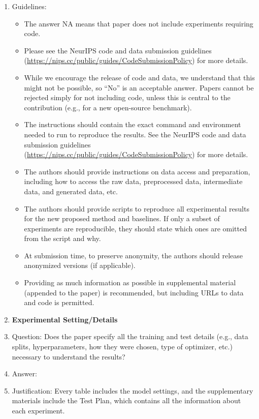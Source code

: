\documentclass{article}
\begin{document}
\begin{enumerate}
    \item[] Guidelines:  
    \begin{itemize}
        \item The answer NA means that paper does not include experiments requiring code.
        \item Please see the NeurIPS code and data submission guidelines (\url{https://nips.cc/public/guides/CodeSubmissionPolicy}) for more details.
        \item While we encourage the release of code and data, we understand that this might not be possible, so “No” is an acceptable answer. Papers cannot be rejected simply for not including code, unless this is central to the contribution (e.g., for a new open-source benchmark).
        \item The instructions should contain the exact command and environment needed to run to reproduce the results. See the NeurIPS code and data submission guidelines (\url{https://nips.cc/public/guides/CodeSubmissionPolicy}) for more details.
        \item The authors should provide instructions on data access and preparation, including how to access the raw data, preprocessed data, intermediate data, and generated data, etc.
        \item The authors should provide scripts to reproduce all experimental results for the new proposed method and baselines. If only a subset of experiments are reproducible, they should state which ones are omitted from the script and why.
        \item At submission time, to preserve anonymity, the authors should release anonymized versions (if applicable).
        \item Providing as much information as possible in supplemental material (appended to the paper) is recommended, but including URLs to data and code is permitted.
    \end{itemize}


\item {\bf Experimental Setting/Details}
    \item[] Question: Does the paper specify all the training and test details (e.g., data splits, hyperparameters, how they were chosen, type of optimizer, etc.) necessary to understand the results?
    \item[] Answer: \answerYes{} %
    \item[] Justification: Every table includes the model settings, and the supplementary materials include the Test Plan, which contains all the information about each experiment.
     

\end{enumerate}
\end{document}
